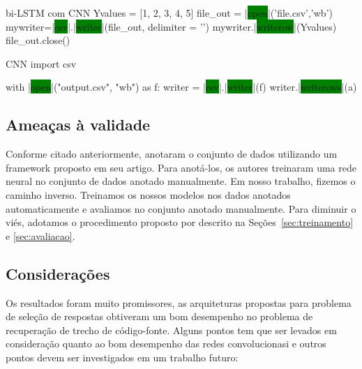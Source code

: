 \begin{tcolorbox}[colframe=orange!75!black,colback=gray!15!white,fonttitle=\bfseries,adjusted title=\large{Python and appending items to text and \colorbox{green}{excel} \colorbox{green}{file}}~\ref{foot:exemplo-resultados-preliminares},
enlarge top by=1cm%
]
\begin{mypython-without-margin}{bi-LSTM com CNN}
Yvalues = [1, 2, 3, 4, 5]
file_out = |\colorbox{green}{open}|('file.csv','wb')
mywriter=|\colorbox{green}{csv}|.|\colorbox{green}{writer}|(file_out, delimiter = '\n')
mywriter.|\colorbox{green}{writerow}|(Yvalues)
file_out.close()
\end{mypython-without-margin}

\begin{mypython-without-margin}{CNN}
import csv

with |\colorbox{green}{open}|("output.csv", "wb") as f:
    writer = |\colorbox{green}{csv}|.|\colorbox{green}{writer}|(f)
    writer.|\colorbox{green}{writerows}|(a)
\end{mypython-without-margin}

\end{tcolorbox}

\subsection{Ameaças à validade}

Conforme citado anteriormente, \cite{yao-2018} anotaram o conjunto de dados utilizando um framework proposto em seu artigo. Para anotá-los, os autores treinaram uma rede neural no conjunto de dados anotado manualmente. Em nosso trabalho, fizemos o caminho inverso. Treinamos os nossos modelos nos dados anotados automaticamente e avaliamos no conjunto anotado manualmente. Para diminuir o viés, adotamos o procedimento proposto por \cite{iyer-etal-2016-summarizing} descrito na Seções~\ref{sec:treinamento} e \ref{sec:avaliacao}.

\subsection{Considerações}

Os resultados foram muito promissores, as arquiteturas propostas para problema de seleção de respostas obtiveram um bom desempenho no problema de recuperação de trecho de código-fonte. Alguns pontos tem que ser levados em consideração quanto ao bom desempenho das redes convolucionasi e outros pontos devem ser investigados em um trabalho futuro:

